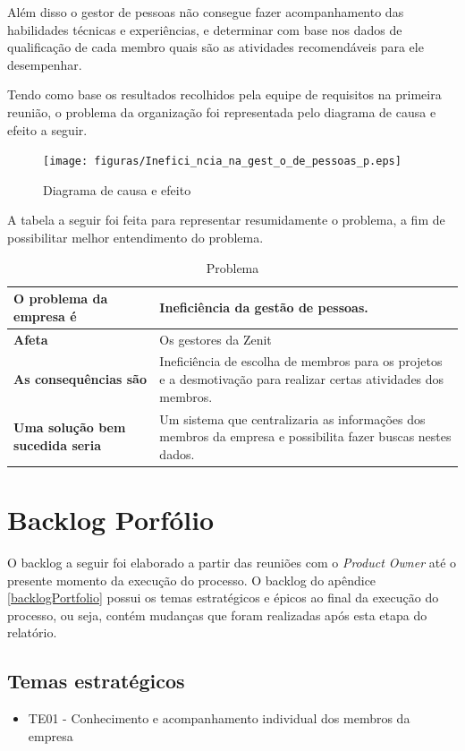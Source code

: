 Além disso o gestor de pessoas não consegue fazer acompanhamento das habilidades técnicas e experiências, e determinar com base nos dados de qualificação de cada membro quais são as atividades recomendáveis para ele desempenhar.

Tendo como base os resultados recolhidos pela equipe de requisitos na primeira reunião, o problema da organização foi representada pelo  diagrama de causa e efeito a seguir.

\begin{figure}[H]
    \centering
    \label{fishBone}
    \texttt{[image: figuras/Inefici\_ncia\_na\_gest\_o\_de\_pessoas\_p.eps]}
    \caption[Diagrama de causa e efeito]{Diagrama de causa e efeito}
\end{figure}

A tabela a seguir foi feita para representar resumidamente o problema, a fim de possibilitar melhor entendimento do problema.

\begin{table}[H]
    \centering
    \label{descricaoAtividades}
    \caption{Problema}
        \begin{tabular}{|l|p{10cm}|}
        \hline
        \textbf{O problema da empresa é} &Ineficiência da gestão de pessoas.\\
        \hline
        \textbf{Afeta} &Os gestores da Zenit\\
        \hline
        \textbf{As consequências são} &Ineficiência de escolha de membros para os projetos e a desmotivação para realizar certas atividades dos membros.\\
        \hline
        \textbf{Uma solução bem sucedida seria} &Um sistema que centralizaria as informações dos membros da empresa e possibilita fazer buscas nestes dados.\\
        \hline
    \end{tabular}
\end{table}

\section{Backlog Porfólio}
O backlog a seguir foi elaborado a partir das reuniões com o \textit{Product Owner} até o presente momento da execução do processo. O backlog do apêndice \ref{backlogPortfolio} possui os temas estratégicos e épicos ao final da execução do processo, ou seja, contém mudanças que foram realizadas após esta etapa do relatório.


\subsection{Temas estratégicos}
\begin{itemize}
\item {TE01 - Conhecimento e acompanhamento individual dos membros da empresa}
\end{itemize}

